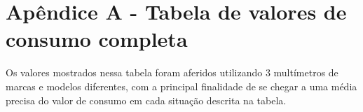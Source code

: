 \newpage
\section{Apêndice A - Tabela de valores de consumo completa}
\label{sc:apendice_a_}

{
Os valores mostrados nessa tabela foram aferidos utilizando 3 multímetros de marcas e modelos diferentes, com a principal finalidade de se chegar a uma média precisa do valor de consumo em cada situação descrita na tabela.
}


